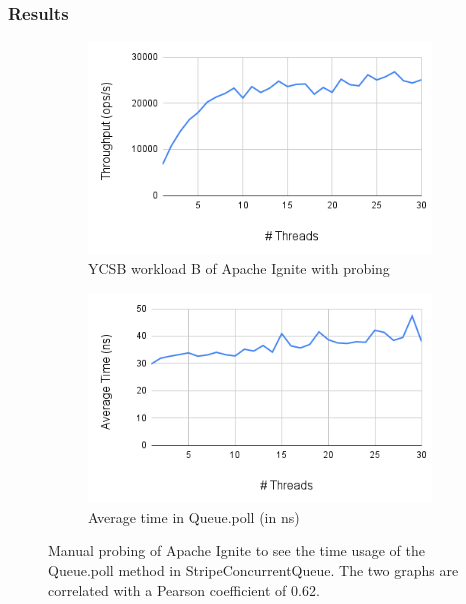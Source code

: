 \documentclass[conference]{IEEEtran}
\begin{document}
\subsubsection{Results}


\begin{figure}
     \centering
     \begin{subfigure}[b]{0.45\textwidth}
         \centering
         \includegraphics[width=\textwidth]{probe_throughput.png}
         \caption{YCSB workload B of Apache Ignite with probing}
         \label{benchmark_probe}
     \end{subfigure}
     \hfill
     \begin{subfigure}[b]{0.45\textwidth}
         \centering
         \includegraphics[width=\textwidth]{probe_results.png}
         \caption{Average time in Queue.poll (in ns)}
         \label{avg_poll}
     \end{subfigure}
\caption{Manual probing of Apache Ignite to see the time usage of the Queue.poll method in StripeConcurrentQueue. The two graphs are correlated with a Pearson coefficient of 0.62.}
\label{probe}
\end{figure}
\end{document}
